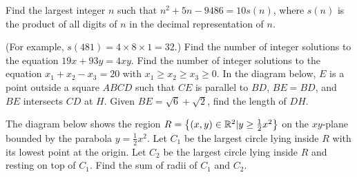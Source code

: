 \begin{enumerate}
\begin{center}
    \end{center}
    \hyperrefitem[Q::2022-O-1-16] Find the largest integer $n$ such that $n^2 + 5n - 9486 = 10s(n)$, where $s(n)$ is the product of all digits of $n$ in the decimal representation of $n$.
    
    (For example, $s(481) = 4 \times 8 \times 1 = 32.$)
    \hyperrefitem[Q::2022-O-1-17] Find the number of integer solutions to the equation $19x + 93y = 4xy$.
    \hyperrefitem[Q::2022-O-1-18] Find the number of integer solutions to the equation $x_1 + x_2 - x_3 = 20$ with $x_1 \geq x_2 \geq x_3 \geq 0$.
    \hyperrefitem[Q::2022-O-1-19] In the diagram below, $E$ is a point outside a square $ABCD$ such that $CE$ is parallel to $BD$, $BE = BD$, and $BE$ intersects $CD$ at $H$. Given $BE = \sqrt6 + \sqrt2$, find the length of $DH$.

    \begin{center}
    \end{center}
    \hyperrefitem[Q::2022-O-1-20] The diagram below shows the region $R = \left\lbrace (x, y) \in \mathbb{R}^2 | y \geq \frac12 x^2 \right\rbrace$ on the $xy$-plane bounded by the parabola $y = \frac12 x^2$. Let $C_1$ be the largest circle lying inside $R$ with its lowest point at the origin. Let $C_2$ be the largest circle lying inside $R$ and resting on top of $C_1$. Find the sum of radii of $C_1$ and $C_2$.
    
    \begin{center}
\end{center}
\end{enumerate}
